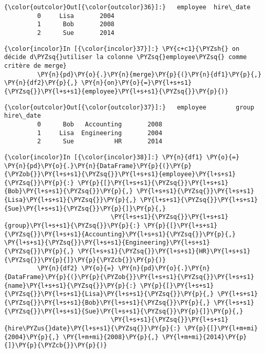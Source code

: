 \begin{Verbatim}[commandchars=\\\{\},frame=single,framerule=0.3mm,rulecolor=\color{cellframecolor}]
{\color{outcolor}Out[{\color{outcolor}36}]:}   employee  hire\_date
         0     Lisa       2004
         1      Bob       2008
         2      Sue       2014
\end{Verbatim}
            
    \begin{Verbatim}[commandchars=\\\{\},frame=single,framerule=0.3mm,rulecolor=\color{cellframecolor}]
{\color{incolor}In [{\color{incolor}37}]:} \PY{c+c1}{\PYZsh{} on décide d\PYZsq{}utiliser la colonne \PYZsq{}employee\PYZsq{} comme critère de merge}
         \PY{n}{pd}\PY{o}{.}\PY{n}{merge}\PY{p}{(}\PY{n}{df1}\PY{p}{,} \PY{n}{df2}\PY{p}{,} \PY{n}{on}\PY{o}{=}\PY{l+s+s1}{\PYZsq{}}\PY{l+s+s1}{employee}\PY{l+s+s1}{\PYZsq{}}\PY{p}{)}
\end{Verbatim}


\begin{Verbatim}[commandchars=\\\{\},frame=single,framerule=0.3mm,rulecolor=\color{cellframecolor}]
{\color{outcolor}Out[{\color{outcolor}37}]:}   employee        group  hire\_date
         0      Bob   Accounting       2008
         1     Lisa  Engineering       2004
         2      Sue           HR       2014
\end{Verbatim}
            
    \begin{Verbatim}[commandchars=\\\{\},frame=single,framerule=0.3mm,rulecolor=\color{cellframecolor}]
{\color{incolor}In [{\color{incolor}38}]:} \PY{n}{df1} \PY{o}{=} \PY{n}{pd}\PY{o}{.}\PY{n}{DataFrame}\PY{p}{(}\PY{p}{\PYZob{}}\PY{l+s+s1}{\PYZsq{}}\PY{l+s+s1}{employee}\PY{l+s+s1}{\PYZsq{}}\PY{p}{:} \PY{p}{[}\PY{l+s+s1}{\PYZsq{}}\PY{l+s+s1}{Bob}\PY{l+s+s1}{\PYZsq{}}\PY{p}{,} \PY{l+s+s1}{\PYZsq{}}\PY{l+s+s1}{Lisa}\PY{l+s+s1}{\PYZsq{}}\PY{p}{,} \PY{l+s+s1}{\PYZsq{}}\PY{l+s+s1}{Sue}\PY{l+s+s1}{\PYZsq{}}\PY{p}{]}\PY{p}{,}
                             \PY{l+s+s1}{\PYZsq{}}\PY{l+s+s1}{group}\PY{l+s+s1}{\PYZsq{}}\PY{p}{:} \PY{p}{[}\PY{l+s+s1}{\PYZsq{}}\PY{l+s+s1}{Accounting}\PY{l+s+s1}{\PYZsq{}}\PY{p}{,} \PY{l+s+s1}{\PYZsq{}}\PY{l+s+s1}{Engineering}\PY{l+s+s1}{\PYZsq{}}\PY{p}{,} \PY{l+s+s1}{\PYZsq{}}\PY{l+s+s1}{HR}\PY{l+s+s1}{\PYZsq{}}\PY{p}{]}\PY{p}{\PYZcb{}}\PY{p}{)}
         \PY{n}{df2} \PY{o}{=} \PY{n}{pd}\PY{o}{.}\PY{n}{DataFrame}\PY{p}{(}\PY{p}{\PYZob{}}\PY{l+s+s1}{\PYZsq{}}\PY{l+s+s1}{name}\PY{l+s+s1}{\PYZsq{}}\PY{p}{:} \PY{p}{[}\PY{l+s+s1}{\PYZsq{}}\PY{l+s+s1}{Lisa}\PY{l+s+s1}{\PYZsq{}}\PY{p}{,} \PY{l+s+s1}{\PYZsq{}}\PY{l+s+s1}{Bob}\PY{l+s+s1}{\PYZsq{}}\PY{p}{,} \PY{l+s+s1}{\PYZsq{}}\PY{l+s+s1}{Sue}\PY{l+s+s1}{\PYZsq{}}\PY{p}{]}\PY{p}{,}
                             \PY{l+s+s1}{\PYZsq{}}\PY{l+s+s1}{hire\PYZus{}date}\PY{l+s+s1}{\PYZsq{}}\PY{p}{:} \PY{p}{[}\PY{l+m+mi}{2004}\PY{p}{,} \PY{l+m+mi}{2008}\PY{p}{,} \PY{l+m+mi}{2014}\PY{p}{]}\PY{p}{\PYZcb{}}\PY{p}{)}
\end{Verbatim}


